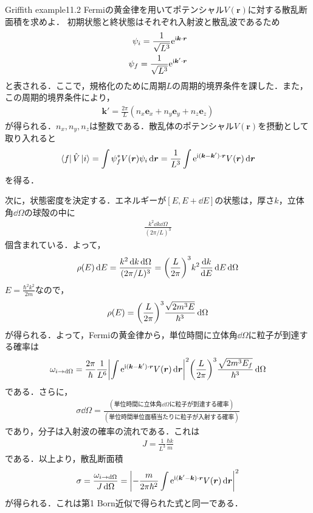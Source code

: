 \documentclass{report}
\begin{document}
  \begin{myexc}{Griffith example11.2}{}
    Fermiの黄金律を用いてポテンシャル$V(\bm{r})$に対する散乱断面積を求めよ．
    \tcblower
    初期状態と終状態はそれぞれ入射波と散乱波であるため
    \begin{align}
      \psi_i = \frac{1}{\sqrt{L^3}} \mathrm{e}^{\mathrm{i} \bm{k}\cdot\bm{r}}\\
      \psi_f = \frac{1}{\sqrt{L^3}} \mathrm{e}^{\mathrm{i} \bm{k}'\cdot\bm{r}}
    \end{align}
    と表される．ここで，規格化のために周期$L$の周期的境界条件を課した．また，この周期的境界条件により，
    \begin{align}
      \bm{k}' = \frac{2\pi}{L}(n_x \bm{e}_x + n_y \bm{e}_y + n_z \bm{e}_z)
    \end{align}
    が得られる．$n_x,n_y,n_z$は整数である．散乱体のポテンシャル$V(\bm{r})$を摂動として取り入れると
    \begin{align}
      \bra{f}\hat{V}\ket{i} = \int \psi_f^{*}V(\bm{r})\psi_i \dd{\bm{r}} = \frac{1}{L^3} \int \mathrm{e}^{\mathrm{i}(\bm{k} - \bm{k}')\cdot \bm{r}} V(\bm{r}) \dd{\bm{r}}
    \end{align}
    を得る．

    次に，状態密度を決定する．エネルギーが$[E,E+\dd{E}]$の状態は，厚さ$k$，立体角$\dd{\Omega}$の球殻の中に
    \begin{align}
      \frac{k^2 \dd{k} \dd{\Omega}}{(2\pi/L)^3}
    \end{align}
    個含まれている．よって，
    \begin{align}
      \rho(E) \dd{E} = \frac{k^2 \dd{k} \dd{\Omega}}{(2\pi/L)^3} = \qty(\frac{L}{2\pi})^3 k^2 \dv{k}{E} \dd{E} \dd{\Omega}
    \end{align}
    $E= \frac{\hbar^2 k^2}{2m}$なので，
    \begin{align}
      \rho(E) = \qty(\frac{L}{2\pi})^3 \frac{\sqrt{2m^3E}}{\hbar^3} \dd{\Omega}
    \end{align}
    が得られる．よって，Fermiの黄金律から，単位時間に立体角$\dd{\Omega}$に粒子が到達する確率は
    \begin{align}
      \omega_{i\to\dd{\Omega}} = \frac{2\pi}{\hbar} \frac{1}{L^6} \abs{\int \mathrm{e}^{\mathrm{i}(\bm{k} - \bm{k}')\cdot \bm{r}} V(\bm{r}) \dd{\bm{r}}}^2 \qty(\frac{L}{2\pi})^3 \frac{\sqrt{2m^3E_f}}{\hbar^3} \dd{\Omega}
    \end{align}
    である．さらに，
    \begin{align}
      \sigma \dd{\Omega} = \frac{(\text{単位時間に立体角$\dd{\Omega}$に粒子が到達する確率})}{(単位時間単位面積当たりに粒子が入射する確率)}
    \end{align}
    であり，分子は入射波の確率の流れである．これは
    \begin{align}
      J = \frac{1}{L^3}\frac{\hbar k}{m}
    \end{align}
    である．以上より，散乱断面積
    \begin{align}
      \sigma = \frac{\omega_{i\to\dd{\Omega}}}{J \dd{\Omega}} = \abs{-\frac{m}{2\pi\hbar^2}\int \mathrm{e}^{\mathrm{i}(\bm{k}' - \bm{k})\cdot\bm{r}}V(\bm{r})\dd{\bm{r}}}^2
    \end{align}
    が得られる．これは第1 Born近似で得られた式と同一である．
  \end{myexc}
\end{document}

